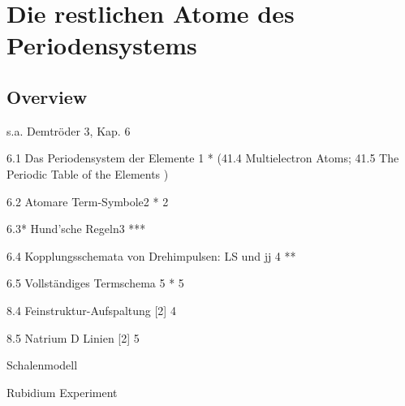 \renewcommand{\lastmod}{10. September 2024}
\renewcommand{\chapterauthors}{Markus Lippitz}

\chapter{Die restlichen Atome des Periodensystems}






\section{Overview}

s.a. Demtröder 3, Kap. 6


6.1 Das Periodensystem der Elemente 1	* (41.4 Multielectron Atoms; 41.5 The Periodic Table of the Elements )

6.2 Atomare Term-Symbole2	*	2 

6.3* Hund’sche Regeln3	***

6.4 Kopplungsschemata von Drehimpulsen: LS und jj 4	**

6.5 Vollständiges Termschema 5	*	5 

8.4 Feinstruktur-Aufspaltung [2] 4	

8.5 Natrium D Linien [2] 5

Schalenmodell

Rubidium Experiment


\printbibliography[segment=\therefsegment,heading=subbibliography]
